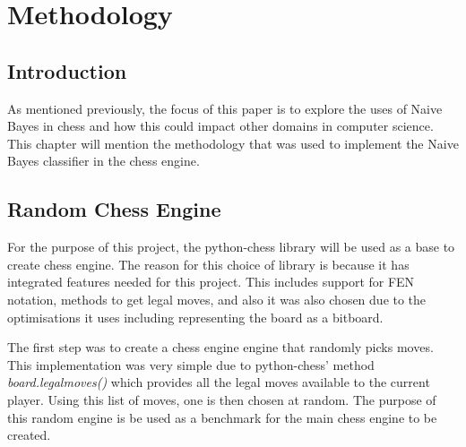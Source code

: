 \chapter{Methodology}

\section{Introduction}
As mentioned previously, the focus of this paper is to explore the uses of Naive Bayes in chess and how this could impact other domains in computer science. This chapter will mention the methodology that was used to implement the Naive Bayes classifier in the chess engine. 

\section{Random Chess Engine}

For the purpose of this project, the python-chess library will be used as a base to create chess engine. The reason for this choice of library is because it has integrated features needed for this project. This includes support for FEN notation, methods to get legal moves, and also it was also chosen due to the optimisations it uses including representing the board as a bitboard.

The first step was to create a chess engine engine that randomly picks moves. This implementation was very simple due to python-chess' method \textit{board.legalmoves()} which provides all the legal moves available to the current player. Using this list of moves, one is then chosen at random. The purpose of this random engine is be used as a benchmark for the main chess engine to be created.

